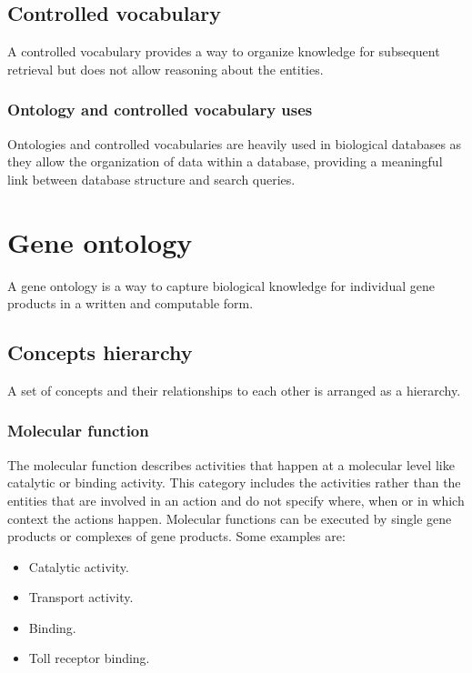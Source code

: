 	\subsection{Controlled vocabulary}
	A controlled vocabulary provides a way to organize knowledge for subsequent retrieval but does not allow reasoning about the entities.

	\subsubsection{Ontology and controlled vocabulary uses}
	Ontologies and controlled vocabularies are heavily used in biological databases as they allow the organization of data within a database, providing a meaningful link between database structure and search queries.


\section{Gene ontology}
A gene ontology is a way to capture biological knowledge for individual gene products in a written and computable form.

	\subsection{Concepts hierarchy}
	A set of concepts and their relationships to each other is arranged as a hierarchy.

		\subsubsection{Molecular function}
		The molecular function describes activities that happen at a molecular level like catalytic or binding activity.
		This category includes the activities rather than the entities that are involved in an action and do not specify where, when or in which context the actions happen.
		Molecular functions can be executed by single gene products or complexes of gene products.
		Some examples are:

		\begin{multicols}{4}
			\begin{itemize}
				\item Catalytic activity.
				\item Transport activity.
				\item Binding.
				\item Toll receptor binding.
			\end{itemize}
		\end{multicols}

